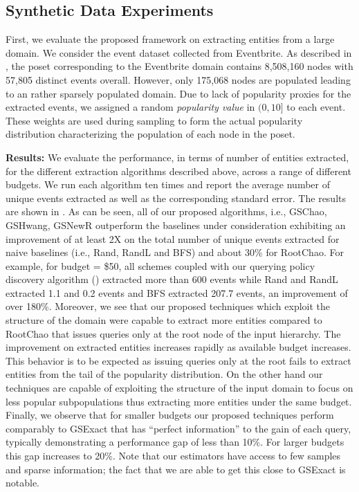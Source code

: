 \subsection{Synthetic Data Experiments}
\label{sec:synthetic}
First, we evaluate the proposed framework on extracting entities from a large domain. We consider the event dataset collected from Eventbrite. As described in , the poset corresponding to the Eventbrite domain contains 8,508,160 nodes with 57,805 distinct events overall. However, only 175,068 nodes are populated leading to an rather sparsely populated domain. Due to lack of popularity proxies for the extracted events, we assigned a random {\em popularity value} in $(0,10]$ to each event. These weights are used during sampling to form the actual popularity distribution characterizing the population of each node in the poset. 

\noindent\textbf{Results:}  We evaluate the performance, in terms of number of entities extracted, for the different extraction algorithms described above, across a range of different budgets. We run each algorithm ten times and report the average number of unique events extracted as well as the corresponding standard error. The results are shown in . As can be seen, all of our proposed algorithms, i.e., GSChao, GSHwang, GSNewR outperform the baselines under consideration exhibiting an improvement of at least 2X on the total number of unique events extracted for naive baselines (i.e., Rand, RandL and BFS) and about 30\% for RootChao. For example, for budget = \$50, all schemes coupled with our querying policy discovery algorithm () extracted more than 600 events while Rand and RandL extracted 1.1 and 0.2 events and BFS extracted 207.7 events, an improvement of over 180\%. Moreover, we see that our proposed techniques which exploit the structure of the domain were capable to extract more entities compared to RootChao that issues queries only at the root node of the input hierarchy. The improvement on extracted entities increases rapidly as available budget increases. This behavior is to be expected as issuing queries only at the root fails to extract entities from the tail of the popularity distribution. On the other hand our techniques are capable of exploiting the structure of the input domain to focus on less popular subpopulations thus extracting more entities under the same budget. Finally, we observe that for smaller budgets our proposed techniques perform comparably to GSExact that has ``perfect information'' to the gain of each query, typically demonstrating a performance gap of less than 10\%. For larger budgets this gap increases to 20\%. Note that our estimators have access to few samples and sparse information; the fact that we are able to get this close to GSExact is notable.

